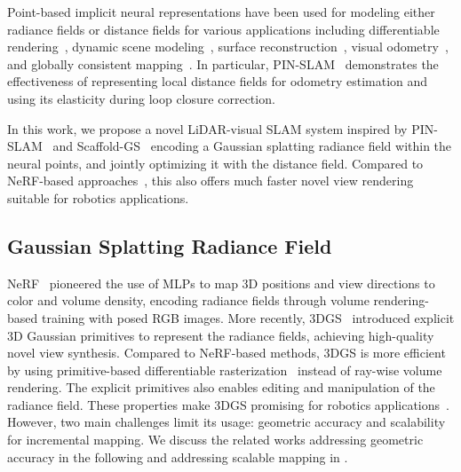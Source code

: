 %
Point-based implicit neural representations have been used for modeling either radiance fields or distance fields for various applications including differentiable rendering~\cite{xu2022cvpr-pointnerf, chen2023iccv-neurbf}, dynamic scene modeling~\cite{abou-chakra2024wacv}, surface reconstruction~\cite{li2022cvpr-dccdif}, visual odometry~\cite{sandstrom2023iccv-pointslam,zhang2024eccv-glorie}, and globally consistent mapping~\cite{pan2024tro-pin}. 
%
In particular, PIN-SLAM~\cite{pan2024tro-pin} demonstrates the effectiveness of representing local distance fields for odometry estimation and using its elasticity during loop closure correction.
%

In this work, we propose a novel LiDAR-visual SLAM system inspired by PIN-SLAM~\cite{pan2024tro-pin} and Scaffold-GS~\cite{lu2024cvpr-scaffoldgs} encoding a Gaussian splatting radiance field within the neural points, and jointly optimizing it with the distance field.
%
Compared to NeRF-based approaches~\cite{xu2022cvpr-pointnerf, chen2023iccv-neurbf}, this also offers much faster novel view rendering suitable for robotics applications.



\subsection{Gaussian Splatting Radiance Field}

NeRF~\cite{mildenhall2020eccv} pioneered the use of MLPs to map 3D positions and view directions to color and volume density, encoding radiance fields through volume rendering-based training with posed RGB images.
%
More recently, 3DGS~\cite{kerbl2023tog-3dgs} introduced explicit 3D Gaussian primitives to represent the radiance fields, achieving high-quality novel view synthesis.
%
Compared to NeRF-based methods, 3DGS is more efficient by using primitive-based differentiable rasterization~\cite{wang2019tog-dss} instead of ray-wise volume rendering.
%
The explicit primitives also enables editing and manipulation of the radiance field.
%
These properties make 3DGS promising for robotics applications~\cite{jin2024arxiv-activegs, li2024arxiv-activesplat, matsuki2024cvpr-monogs, wildersmith2024iros, abou-chakra2024corl}.
%
However, two main challenges limit its usage: geometric accuracy and scalability for incremental mapping.
% 
We discuss the related works addressing geometric accuracy in the following and addressing scalable mapping in .




